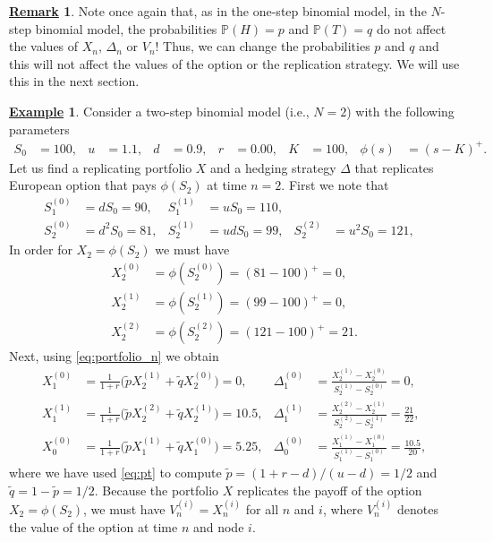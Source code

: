 \documentclass[12pt]{book}
\numberwithin{equation}{chapter}
\theoremstyle{plain}
\numberwithin{theorem}{section}
\theoremstyle{definition}
\newtheorem{example}[theorem]{\underline{Example}}
\newtheorem{remark}[theorem]{\underline{Remark}}
\numberwithin{exercise}{chapter}
\newcommand{\<}{\langle}
\renewcommand{\>}{\rangle}
\renewcommand{\(}{\left(}
\renewcommand{\)}{\right)}
\renewcommand{\[}{\left[}
\renewcommand{\]}{\right]}
\newcommand\Pb{\mathds{P}}
\newcommand\Del{\Delta}
\newcommand\qt{\widetilde{q}}
\theoremstyle{definition}
\numberwithin{question}{section}
\newcommand\pt{\widetilde{p}}
\begin{document}
\begin{remark}
\label{rmk:pq2}
Note once again that, as in the one-step binomial model, in the $N$-step binomial model, the probabilities $\Pb(H)=p$ and $\Pb(T)=q$ do not affect the values of $X_n$, $\Del_n$ or $V_n$!  Thus, we can change the probabilities $p$ and $q$ and this will not affect the values of the option or the replication strategy.  We will use this in the next section.
\end{remark}

\begin{example}
\label{ex:binomial-replication}
Consider a two-step binomial model (i.e., $N=2$) with the following parameters
\begin{align}
S_0
	&=	100, &
u
	&= 	1.1, &
d
	&=	0.9, &
r
	&=	0.00 , &
K
	&=	100, &
\phi(s)
	&=	( s - K )^+ .
\end{align}
Let us find a replicating portfolio $X$ and a hedging strategy $\Del$ that replicates European option that pays $\phi(S_2)$ at time $n=2$.  First we note that
\begin{align}
S_1^{(0)}
	&=	d S_0 = 90 , &
S_1^{(1)}
	&=	u S_0 = 110	, \\
S_2^{(0)}
	&=	d^2 S_0 = 81 , &
S_2^{(1)}
	&=	u d S_0 = 99 , &
S_2^{(2)}
	&=	u^2 S_0 = 121 , &
\end{align}
In order for $X_2 = \phi(S_2)$ we must have
\begin{align}
X_2^{(0)}
	&=	\phi(S_2^{(0)}) = ( 81 - 100 )^+ = 0 , \\
X_2^{(1)}
	&=	\phi(S_2^{(1)}) = ( 99 - 100 )^+ = 0 , \\
X_2^{(2)}
	&=	\phi(S_2^{(2)}) = ( 121 - 100 )^+ = 21 .
\end{align}
Next, using \eqref{eq:portfolio_n} we obtain
\begin{align}
X_1^{(0)}
	&=	\frac{1}{1+r} \Big( \pt X_2^{(1)} + \qt X_2^{(0)} \Big) = 0, &
\Del_1^{(0)}
	&=	\frac{X_2^{(1)}- X_2^{(0)}}{S_2^{(1)} - S_2^{(0)}} = 0 , \\
X_1^{(1)}
	&=	\frac{1}{1+r} \Big( \pt X_2^{(2)} + \qt X_2^{(1)} \Big) = 10.5 , &
\Del_1^{(1)}
	&=	\frac{X_2^{(2)} - X_2^{(1)}}{S_2^{(2)}- S_2^{(1)}} =  \frac{21}{22} , \\
X_0^{(0)}
	&=	\frac{1}{1+r} \Big( \pt X_1^{(1)} + \qt X_1^{(0)} \Big) = 5.25 , &
\Del_0^{(0)}
	&=	\frac{X_1^{(1)} - X_1^{(0)}}{S_1^{(1)}- S_1^{(0)}} = \frac{10.5}{20} ,
\end{align}
where we have used \eqref{eq:pt} to compute $\pt = ( 1 + r - d)/(u-d) = 1/2$ and $\qt = 1- \pt = 1/2$.
Because the portfolio $X$ replicates the payoff of the option $X_2 = \phi(S_2)$, we must have $V_n^{(i)} = X_n^{(i)}$ for all $n$ and $i$, where $V_n^{(i)}$ denotes the value of the option at time $n$ and node $i$.
\end{example}
\end{document}
